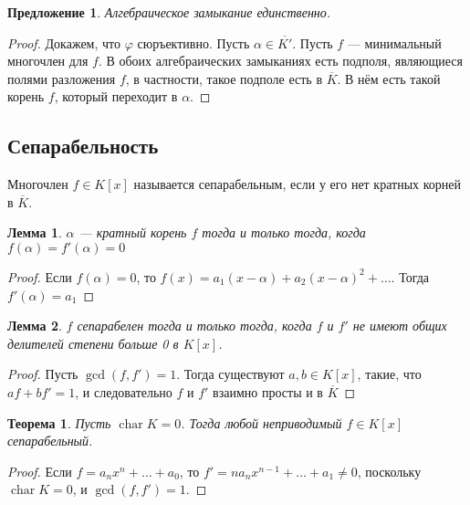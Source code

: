 \documentclass[a4paper]{article}
\let\temp\phi
\let\phi\varphi
\let\varphi\temp
\DeclareMathOperator{\chr}{char}
\newtheorem{theorem}{Теорема}
\numberwithin{theorem}{section}
\newtheorem{lemma}{Лемма}
\numberwithin{lemma}{section}
\newtheorem{proposition}{Предложение}
\numberwithin{proposition}{section}
\numberwithin{corollary}{section}
\begin{document}
\begin{proposition}
Алгебраическое замыкание единственно.
\end{proposition}
\begin{proof}
\begin{minipage}{0.15\linewidth}
\end{minipage}
\begin{minipage}{0.63\linewidth}
Докажем, что $\phi$ сюръективно. Пусть $\alpha \in \overline{K'}$.
Пусть $f$ --- минимальный многочлен для $f$. В обоих алгебраических
замыканиях есть подполя, являющиеся полями разложения $f$, в частности,
такое подполе есть в $\overline{K}$. В нём есть такой корень $f$,
который переходит в $\alpha$.
\end{minipage}
\end{proof}

\subsection*{Сепарабельность}

Многочлен $f \in K[x]$ называется $\textbf{сепарабельным}$,
если у его нет кратных корней в $\overline{K}$.

\begin{lemma}
$\alpha$ --- кратный корень $f$ тогда и только тогда,
когда $f(\alpha) = f'(\alpha) = 0$
\end{lemma}
\begin{proof}
Если $f(\alpha) = 0$,
то $f(x) = a_1(x - \alpha) + a_2 (x - \alpha)^2 + \ldots$.
Тогда $f'(\alpha) = a_1$
\end{proof}
\begin{lemma}
$f$ сепарабелен тогда и только тогда,
когда $f$ и $f'$ не имеют общих делителей степени больше 0 в $K[x]$.
\end{lemma}
\begin{proof}
Пусть $\gcd(f, f') = 1$. Тогда существуют $a, b \in K[x]$, такие,
что $af + bf' = 1$, и следовательно $f$ и $f'$ взаимно просты и в
$\overline{K}$
\end{proof}

\begin{theorem}
Пусть $\chr K = 0$. Тогда любой неприводимый $f \in K[x]$ сепарабельный.
\end{theorem}
\begin{proof}
Если $f = a_nx^n + \ldots + a_0$, то $f' = n a_nx^{n-1}+\ldots+a_1 \ne 0$, поскольку $\chr K = 0$, и $\gcd(f, f') = 1$.
\end{proof}
\end{document}
